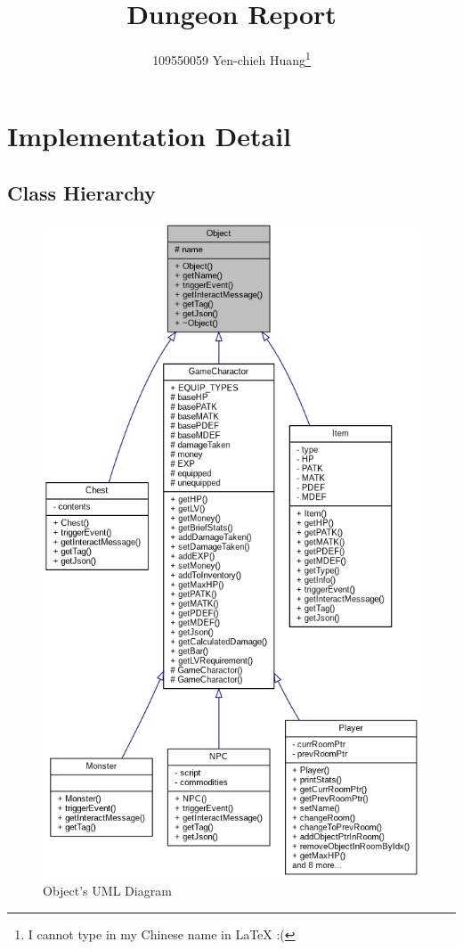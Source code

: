 \documentclass{article}
\title{Dungeon Report}
\author{109550059 Yen-chieh Huang\thanks{I cannot type in my Chinese name in \LaTeX{} :(}}
\date{}
\begin{document}
\maketitle
\tableofcontents
\newpage

\section{Implementation Detail}

    \subsection{Class Hierarchy}
    
    \begin{figure}[h]
        \centering
        \includegraphics[width=0.6\linewidth]{object_uml}
        \caption{Object's UML Diagram}
    \end{figure}
\end{document}
